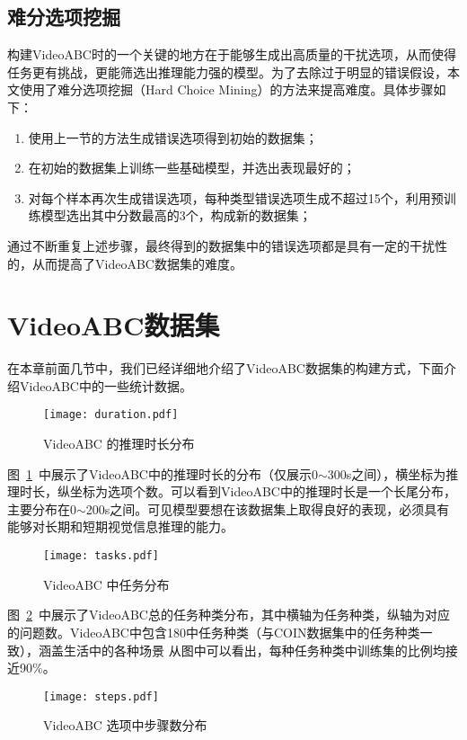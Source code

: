 \subsection{难分选项挖掘}
构建VideoABC时的一个关键的地方在于能够生成出高质量的干扰选项，从而使得任务更有挑战，更能筛选出推理能力强的模型。为了去除过于明显的错误假设，本文使用了难分选项挖掘（Hard Choice Mining）的方法来提高难度。具体步骤如下：
\begin{enumerate}
    \item 使用上一节的方法生成错误选项得到初始的数据集；
    \item 在初始的数据集上训练一些基础模型，并选出表现最好的；
    \item 对每个样本再次生成错误选项，每种类型错误选项生成不超过15个，利用预训练模型选出其中分数最高的3个，构成新的数据集；
\end{enumerate}
通过不断重复上述步骤，最终得到的数据集中的错误选项都是具有一定的干扰性的，从而提高了VideoABC数据集的难度。

\section{VideoABC数据集}
在本章前面几节中，我们已经详细地介绍了VideoABC数据集的构建方式，下面介绍VideoABC中的一些统计数据。
\begin{figure}[htbp]
    \texttt{[image: duration.pdf]}
    \caption{VideoABC 的推理时长分布}
    \label{fig:duration}
\end{figure}

图~\ref{fig:duration}~中展示了VideoABC中的推理时长的分布（仅展示0$\sim$300s之间），横坐标为推理时长，纵坐标为选项个数。可以看到VideoABC中的推理时长是一个长尾分布，主要分布在0$\sim$200s之间。可见模型要想在该数据集上取得良好的表现，必须具有能够对长期和短期视觉信息推理的能力。

\begin{figure}[htbp]
    \centering
    \texttt{[image: tasks.pdf]}
    \caption{VideoABC 中任务分布}
    \label{fig:tasks}
\end{figure}
图~\ref{fig:tasks}~中展示了VideoABC总的任务种类分布，其中横轴为任务种类，纵轴为对应的问题数。VideoABC中包含180中任务种类（与COIN数据集中的任务种类一致），涵盖生活中的各种场景
从图中可以看出，每种任务种类中训练集的比例均接近90\%。

\begin{figure}[htbp]
    \centering
    \texttt{[image: steps.pdf]}
    \caption{VideoABC 选项中步骤数分布}
    \label{fig:steps}
\end{figure}

